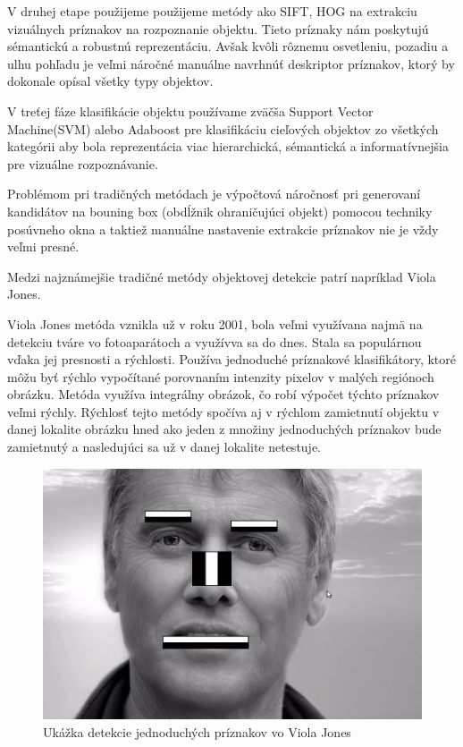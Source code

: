 V druhej etape použijeme použijeme metódy ako SIFT, HOG na extrakciu vizuálnych príznakov na rozpoznanie objektu. Tieto príznaky nám poskytujú sémantickú a robustnú reprezentáciu. Avšak kvôli rôznemu osvetleniu, pozadiu a ulhu pohľadu je veľmi náročné manuálne navrhnúť deskriptor príznakov, ktorý by dokonale opísal všetky typy objektov. 

V treťej fáze klasifikácie objektu používame zväčša Support Vector Machine(SVM) alebo Adaboost pre klasifikáciu cieľových objektov zo všetkých kategórii aby bola reprezentácia viac hierarchická, sémantická a informatívnejšia pre vizuálne rozpoznávanie. 

Problémom pri tradičných metódach je výpočtová náročnosť pri generovaní kandidátov na bouning box (obdĺžnik ohraničujúci objekt) pomocou techniky posúvneho okna a taktiež manuálne nastavenie extrakcie príznakov nie je vždy veľmi presné. 

Medzi najznámejšie tradičné metódy objektovej detekcie patrí napríklad Viola Jones.

Viola Jones metóda vznikla už v roku 2001, bola veľmi využívana najmä na detekciu tváre vo fotoaparátoch a využívva sa do dnes. Stala sa populárnou vďaka jej presnosti a rýchlosti. Používa jednoduché príznakové klasifikátory, ktoré môžu byť rýchlo vypočítané porovnaním intenzity pixelov v malých regiónoch obrázku. Metóda využíva integrálny obrázok, čo robí výpočet týchto príznakov veľmi rýchly. Rýchlosť tejto metódy spočíva aj v rýchlom zamietnutí objektu v danej lokalite obrázku hned ako jeden z množiny jednoduchých príznakov bude zamietnutý a nasledujúci sa už v danej lokalite netestuje. 
\cite{viola2001rapid}


\begin{figure}
\includegraphics{images/viola_jones.jpg}
\caption{Ukážka detekcie jednoduchých príznakov vo Viola Jones}
\label{fig:image}
\end{figure}


